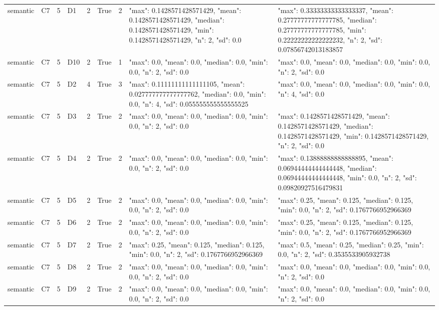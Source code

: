 \begin{tabular}{lllllllll}
semantic & C7 & 5 & D1 & 2 & True & 2 & {"max": 0.1428571428571429, "mean": 0.1428571428571429, "median": 0.1428571428571429, "min": 0.1428571428571429, "n": 2, "sd": 0.0} & {"max": 0.33333333333333337, "mean": 0.27777777777777785, "median": 0.27777777777777785, "min": 0.22222222222222232, "n": 2, "sd": 0.07856742013183857} \\
semantic & C7 & 5 & D10 & 2 & True & 1 & {"max": 0.0, "mean": 0.0, "median": 0.0, "min": 0.0, "n": 2, "sd": 0.0} & {"max": 0.0, "mean": 0.0, "median": 0.0, "min": 0.0, "n": 2, "sd": 0.0} \\
semantic & C7 & 5 & D2 & 4 & True & 3 & {"max": 0.11111111111111105, "mean": 0.027777777777777762, "median": 0.0, "min": 0.0, "n": 4, "sd": 0.055555555555555525} & {"max": 0.0, "mean": 0.0, "median": 0.0, "min": 0.0, "n": 4, "sd": 0.0} \\
semantic & C7 & 5 & D3 & 2 & True & 2 & {"max": 0.0, "mean": 0.0, "median": 0.0, "min": 0.0, "n": 2, "sd": 0.0} & {"max": 0.1428571428571429, "mean": 0.1428571428571429, "median": 0.1428571428571429, "min": 0.1428571428571429, "n": 2, "sd": 0.0} \\
semantic & C7 & 5 & D4 & 2 & True & 2 & {"max": 0.0, "mean": 0.0, "median": 0.0, "min": 0.0, "n": 2, "sd": 0.0} & {"max": 0.13888888888888895, "mean": 0.06944444444444448, "median": 0.06944444444444448, "min": 0.0, "n": 2, "sd": 0.09820927516479831} \\
semantic & C7 & 5 & D5 & 2 & True & 2 & {"max": 0.0, "mean": 0.0, "median": 0.0, "min": 0.0, "n": 2, "sd": 0.0} & {"max": 0.25, "mean": 0.125, "median": 0.125, "min": 0.0, "n": 2, "sd": 0.1767766952966369} \\
semantic & C7 & 5 & D6 & 2 & True & 2 & {"max": 0.0, "mean": 0.0, "median": 0.0, "min": 0.0, "n": 2, "sd": 0.0} & {"max": 0.25, "mean": 0.125, "median": 0.125, "min": 0.0, "n": 2, "sd": 0.1767766952966369} \\
semantic & C7 & 5 & D7 & 2 & True & 2 & {"max": 0.25, "mean": 0.125, "median": 0.125, "min": 0.0, "n": 2, "sd": 0.1767766952966369} & {"max": 0.5, "mean": 0.25, "median": 0.25, "min": 0.0, "n": 2, "sd": 0.3535533905932738} \\
semantic & C7 & 5 & D8 & 2 & True & 2 & {"max": 0.0, "mean": 0.0, "median": 0.0, "min": 0.0, "n": 2, "sd": 0.0} & {"max": 0.0, "mean": 0.0, "median": 0.0, "min": 0.0, "n": 2, "sd": 0.0} \\
semantic & C7 & 5 & D9 & 2 & True & 2 & {"max": 0.0, "mean": 0.0, "median": 0.0, "min": 0.0, "n": 2, "sd": 0.0} & {"max": 0.0, "mean": 0.0, "median": 0.0, "min": 0.0, "n": 2, "sd": 0.0} \\
\end{tabular}